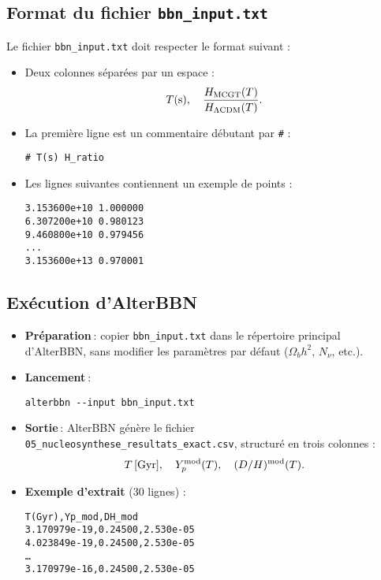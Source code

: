 \subsection{Format du fichier \texttt{bbn\_input.txt}}

Le fichier \texttt{bbn\_input.txt} doit respecter le format suivant :

\begin{itemize}
  \item Deux colonnes séparées par un espace :
    \[
      T(\mathrm{s}),\quad \frac{H_{\rm MCGT}(T)}{H_{\Lambda\mathrm{CDM}}(T)}.
    \]
  \item La première ligne est un commentaire débutant par \texttt{\#} :
    \begin{verbatim}
# T(s) H_ratio
    \end{verbatim}
  \item Les lignes suivantes contiennent un exemple de points :
    \begin{verbatim}
3.153600e+10 1.000000
6.307200e+10 0.980123
9.460800e+10 0.979456
...
3.153600e+13 0.970001
    \end{verbatim}
\end{itemize}

\subsection{Exécution d’AlterBBN}

\begin{itemize}
  \item \textbf{Préparation} :
    copier \texttt{bbn\_input.txt} dans le répertoire principal d’AlterBBN, sans modifier les paramètres par défaut (\(\Omega_{b}h^{2},\,N_{\nu}\), etc.).
  \item \textbf{Lancement} :
    \begin{verbatim}
alterbbn --input bbn_input.txt
    \end{verbatim}
  \item \textbf{Sortie} :
  AlterBBN génère le fichier \texttt{05\_nucleosynthese\_resultats\_exact.csv}, structuré en trois colonnes :
  \[
    T\,[\mathrm{Gyr}],\quad Y_{p}^{\rm mod}(T),\quad (D/H)^{\rm mod}(T).
  \]
\item \textbf{Exemple d’extrait} (30 lignes) :
  \begin{verbatim}
T(Gyr),Yp_mod,DH_mod
3.170979e-19,0.24500,2.530e-05
4.023849e-19,0.24500,2.530e-05
…
3.170979e-16,0.24500,2.530e-05
  \end{verbatim}
\end{itemize}

